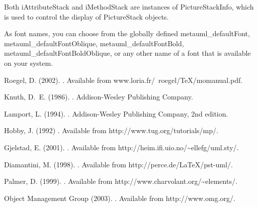 \documentclass{article}
\newcommand{\code}{\ttfamily}
\begin{document}
\begin{verbatim}
\end{verbatim}

Both {\code iAttributeStack} and {\code iMethodStack} are instances of
{\code PictureStackInfo}, which is used to control the display of {\code PictureStack} objects.

As font names, you can choose from the globally defined {\code metauml\_defaultFont}, {\code metauml\_defaultFontOblique}, {\code metauml\_defaultFontBold}, {\code metauml\_defaultFontBoldOblique}, or any other name of a font that is available on your system.




\begin{thebibliography}{1}
Roegel, D. (2002).
.
\newblock Available from {\code www.loria.fr/~roegel/TeX/momanual.pdf}.

Knuth, D.~E. (1986).
.
\newblock Addison-Wesley Publishing Company.

Lamport, L. (1994).
.
\newblock Addison-Wesley Publishing Company, 2nd edition.


Hobby, J. (1992)
.
\newblock Available from {\code http://www.tug.org/tutorials/mp/}.

Gjelstad, E. (2001).
.
\newblock Available from {\code http://heim.ifi.uio.no/\~{ }ellefg/uml.sty/}.

Diamantini, M. (1998).
.
\newblock Available from {\code http://perce.de/LaTeX/pst-uml/}.

Palmer, D. (1999).
.
\newblock Available from {\code http://www.charvolant.org/\~{ }elements/}.

Object Management Group (2003).
.
\newblock Available from {\code http://www.omg.org/}.
\end{thebibliography}

\pagebreak
\pagebreak
\pagebreak

\end{document}
